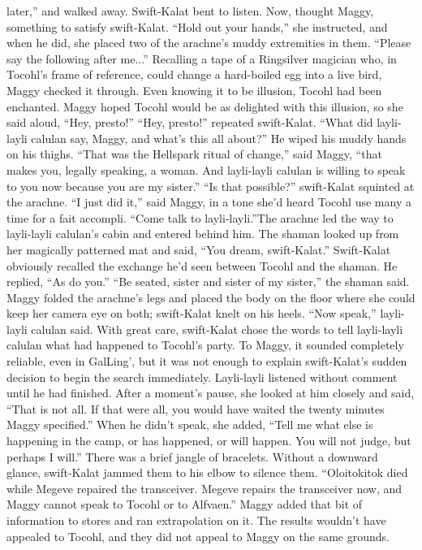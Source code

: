 \documentclass[9pt]{article}
\begin{document}
later,” and walked away. Swift-Kalat bent to listen.
Now, thought Maggy, something to satisfy swift-Kalat. “Hold out your hands,” she instructed, and
when he did, she placed two of the arachne’s muddy extremities in them. “Please say the following after
me...”
Recalling a tape of a Ringsilver magician who, in Tocohl’s frame of reference, could change a
hard-boiled egg into a live bird, Maggy checked it through. Even knowing it to be illusion, Tocohl had
been enchanted. Maggy hoped Tocohl would be as delighted with this illusion, so she said aloud, “Hey,
presto!”
“Hey, presto!” repeated swift-Kalat. “What did layli-layli calulan say, Maggy, and what’s this all
about?” He wiped his muddy hands on his thighs.
“That was the Hellspark ritual of change,” said Maggy, “that makes you, legally speaking, a woman.
And layli-layli calulan is willing to speak to you now because you are my sister.”
“Is that possible?” swift-Kalat squinted at the arachne.
“I just did it,” said Maggy, in a tone she’d heard Tocohl use many a time for a fait accompli. “Come
talk to layli-layli.”The arachne led the way to layli-layli calulan’s cabin and entered behind him. The shaman looked
up from her magically patterned mat and said, “You dream, swift-Kalat.”
Swift-Kalat obviously recalled the exchange he’d seen between Tocohl and the shaman. He replied,
“As do you.”
“Be seated, sister and sister of my sister,” the shaman said. Maggy folded the arachne’s legs and
placed the body on the floor where she could keep her camera eye on both; swift-Kalat knelt on his
heels. “Now speak,” layli-layli calulan said.
With great care, swift-Kalat chose the words to tell layli-layli calulan what had happened to
Tocohl’s party. To Maggy, it sounded completely reliable, even in GalLing’, but it was not enough to
explain swift-Kalat’s sudden decision to begin the search immediately.
Layli-layli listened without comment until he had finished. After a moment’s pause, she looked at him
closely and said, “That is not all. If that were all, you would have waited the twenty minutes Maggy
specified.” When he didn’t speak, she added, “Tell me what else is happening in the camp, or has
happened, or will happen. You will not judge, but perhaps I will.”
There was a brief jangle of bracelets. Without a downward glance, swift-Kalat jammed them to his
elbow to silence them. “Oloitokitok died while Megeve repaired the transceiver. Megeve repairs the
transceiver now, and Maggy cannot speak to Tocohl or to Alfvaen.”
Maggy added that bit of information to stores and ran extrapolation on it. The results wouldn’t have
appealed to Tocohl, and they did not appeal to Maggy on the same grounds.
\end{document}
